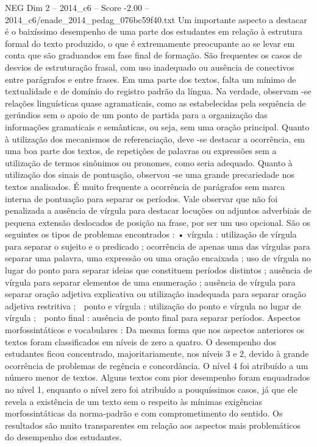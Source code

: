 \begin{textsample}{NEG Dim 2 – 2014\_c6 – Score -2.00 – 2014\_c6/enade\_2014\_pedag\_076bc59f40.txt}
Um importante aspecto a destacar é o baixíssimo desempenho de uma parte dos estudantes em relação à estrutura formal do texto produzido, o que é extremamente preocupante ao se levar em conta que são graduandos em fase final de formação.
São frequentes os casos de desvios de estruturação frasal, com uso inadequado ou ausência de conectivos entre parágrafos e entre frases.
Em uma parte dos textos, falta um mínimo de textualidade e de domínio do registro padrão da língua.
Na verdade, observam -se relações linguísticas quase agramaticais, como as estabelecidas pela sequência de gerúndios sem o apoio de um ponto de partida para a organização das informações gramaticais e semânticas, ou seja, sem uma oração principal.
Quanto à utilização dos mecanismos de referenciação, deve -se destacar a ocorrência, em uma boa parte dos textos, de repetições de palavras ou expressões sem a utilização de termos sinônimos ou pronomes, como seria adequado.
Quanto à utilização dos sinais de pontuação, observou -se uma grande precariedade nos textos analisados.
É muito frequente a ocorrência de parágrafos sem marca interna de pontuação para separar os períodos.
Vale observar que não foi penalizada a ausência de vírgula para destacar locuções ou adjuntos adverbiais de pequena extensão deslocados de posição na frase, por ser um uso opcional.
São os seguintes os tipos de problemas encontrados : • vírgula : utilização de vírgula para separar o sujeito e o predicado ; ocorrência de apenas uma das vírgulas para separar uma palavra, uma expressão ou uma oração encaixada ; uso de vírgula no lugar do ponto para separar ideias que constituem períodos distintos ; ausência de vírgula para separar elementos de uma enumeração ; ausência de vírgula para separar oração adjetiva explicativa ou utilização inadequada para separar oração adjetiva restritiva ;  ponto e vírgula : utilização do ponto e vírgula no lugar de vírgula ;  ponto final : ausência de ponto final para separar períodos.
Aspectos morfossintáticos e vocabulares : Da mesma forma que nos aspectos anteriores os textos foram classificados em níveis de zero a quatro.
O desempenho dos estudantes ficou concentrado, majoritariamente, nos níveis 3 e 2, devido à grande ocorrência de problemas de regência e concordância.
O nível 4 foi atribuído a um número menor de textos.
Alguns textos com pior desempenho foram enquadrados no nível 1, enquanto o nível zero foi atribuído a pouquíssimos casos, já que ele revela a existência de um texto sem o respeito às mínimas exigências morfossintáticas da norma-padrão e com comprometimento do sentido.
Os resultados são muito transparentes em relação aos aspectos mais problemáticos do desempenho dos estudantes.

\end{textsample}
